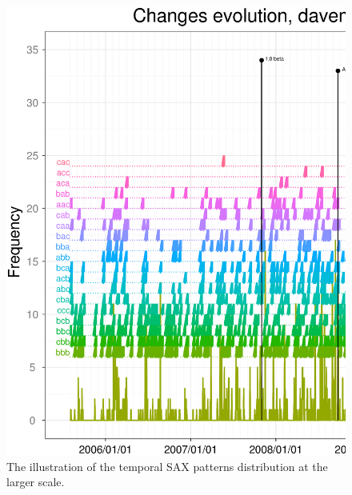 \documentclass[a4paper,10pt]{article}
\numberwithin{equation}{subsection}
\begin{document}
\begin{figure}[h]
\noindent\begin{minipage}{\textwidth}
  \centering
  \includegraphics[width=\textwidth]{figures/long_patterns.ps}
  \caption{The illustration of the temporal SAX patterns distribution at the larger scale.}
  \label{fig:march_patterns2}
\end{minipage}
\end{figure}



\clearpage
\end{document}
